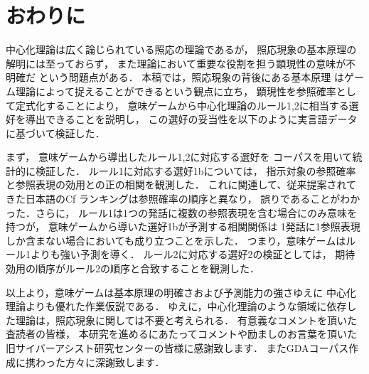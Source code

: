\section{おわりに}

中心化理論は広く論じられている照応の理論であるが，
照応現象の基本原理の解明には至っておらず，
また理論において重要な役割を担う顕現性の意味が不明確だ
という問題点がある．
本稿では，照応現象の背後にある基本原理
はゲーム理論によって捉えることができるという観点に立ち，
顕現性を参照確率として定式化することにより，
意味ゲームから中心化理論のルール1,2に相当する選好を導出できることを説明し，
この選好の妥当性を以下のように実言語データに基づいて検証した．

まず，
意味ゲームから導出したルール1,2に対応する選好を
コーパスを用いて統計的に検証した．
ルール1に対応する選好1bについては，
指示対象の参照確率と参照表現の効用との正の相関を観測した．
これに関連して、従来提案されてきた日本語のCf ランキングは参照確率の順序と異なり，
誤りであることがわかった．さらに，
ルール1は1つの発話に複数の参照表現を含む場合にのみ意味を持つが，
意味ゲームから導いた選好1bが予測する相関関係は
1発話に1参照表現しか含まない場合においても成り立つことを示した．
つまり，意味ゲームはルール1よりも強い予測を導く．
ルール2に対応する選好2の検証としては，
期待効用の順序がルール2の順序と合致することを観測した．

以上より，意味ゲームは基本原理の明確さおよび予測能力の強さゆえに
中心化理論よりも優れた作業仮説である．
ゆえに，中心化理論のような領域に依存した理論は，照応現象に関しては不要と考えられる．
\acknowledgment
有意義なコメントを頂いた査読者の皆様，
本研究を進めるにあたってコメントや励ましのお言葉を頂いた
旧サイバーアシスト研究センターの皆様に感謝致します．
またGDAコーパス作成に携わった方々に深謝致します．

